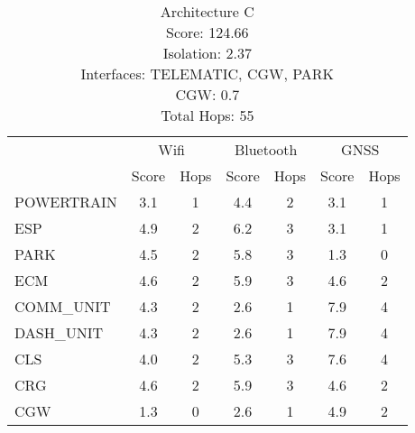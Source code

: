 \begin{table}[ht]
    \centering
    \caption{Architecture C \\ Score: 124.66 \\ Isolation: 2.37 \\ Interfaces: TELEMATIC, CGW, PARK \\ CGW: 0.7 \\ Total Hops: 55}
    \label{tab:archC}
    \begin{tabular}{lcccccc}
    \hline
    & \multicolumn{2}{c}{Wifi} & \multicolumn{2}{c}{Bluetooth} & \multicolumn{2}{c}{GNSS} \\
    & Score & Hops & Score & Hops & Score & Hops \\
    \hline
        POWERTRAIN & 3.1 & 1 & 4.4 & 2 & 3.1 & 1 \\
        ESP & 4.9 & 2 & 6.2 & 3 & 3.1 & 1 \\
        PARK & 4.5 & 2 & 5.8 & 3 & 1.3 & 0 \\
        ECM & 4.6 & 2 & 5.9 & 3 & 4.6 & 2 \\
        COMM\_UNIT & 4.3 & 2 & 2.6 & 1 & 7.9 & 4 \\
        DASH\_UNIT & 4.3 & 2 & 2.6 & 1 & 7.9 & 4 \\
        CLS & 4.0 & 2 & 5.3 & 3 & 7.6 & 4 \\
        CRG & 4.6 & 2 & 5.9 & 3 & 4.6 & 2 \\
        CGW & 1.3 & 0 & 2.6 & 1 & 4.9 & 2 \\
    \hline
    \end{tabular}
\end{table}
